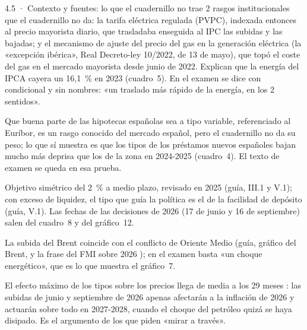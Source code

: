 \begin{complemento}{4.5 · Contexto y fuentes: lo que el cuadernillo no trae}
 2 rasgos institucionales que el cuadernillo no da: la tarifa eléctrica regulada (PVPC), indexada entonces al precio mayorista diario, que trasladaba enseguida al IPC las subidas y las bajadas; y el mecanismo de ajuste del precio del gas en la generación eléctrica (la «excepción ibérica», Real Decreto-ley 10/2022, de 13 de mayo), que topó el coste del gas en el mercado mayorista desde junio de 2022. Explican que la energía del IPCA cayera un 16,1~\% en 2023 (cuadro~5). En el examen se dice con condicional y sin nombres: «un traslado más rápido de la energía, en los 2 sentidos».

 Que buena parte de las hipotecas españolas sea a tipo variable, referenciado al Euríbor, es un rasgo conocido del mercado español, pero el cuadernillo no da su peso; lo que sí muestra es que los tipos de los préstamos nuevos españoles bajan mucho más deprisa que los de la zona en 2024-2025 (cuadro~4). El texto de examen se queda en esa prueba.

 Objetivo simétrico del 2~\% a medio plazo, revisado en 2025 \parencite{BCE2025Estrategia} (guía, III.1 y V.1); con exceso de liquidez, el tipo que guía la política es el de la facilidad de depósito (guía, V.1). Las fechas de las decisiones de 2026 (17 de junio y 16 de septiembre) salen del cuadro~8 y del gráfico~12.

 La subida del Brent coincide con el conflicto de Oriente Medio (guía, gráfico del Brent, y la frase del FMI sobre 2026 \parencite{FMI2026ArticuloIV}); en el examen basta «un choque energético», que es lo que muestra el gráfico~7.

 El efecto máximo de los tipos sobre los precios llega de media a los 29 meses \parencite{HavranekRusnak2013}: las subidas de junio y septiembre de 2026 apenas afectarán a la inflación de 2026 y actuarán sobre todo en 2027-2028, cuando el choque del petróleo quizá se haya disipado. Es el argumento de los que piden «mirar a través».
\end{complemento}

